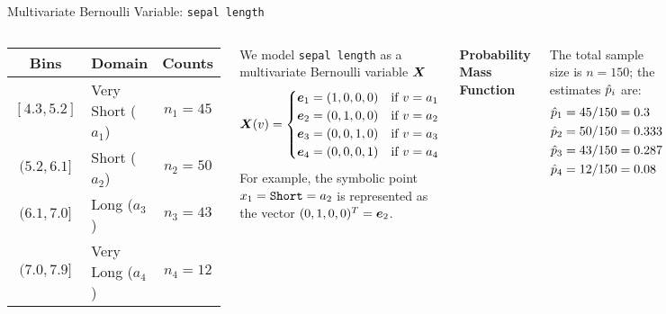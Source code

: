 \begin{frame}{Multivariate Bernoulli Variable: {\tt sepal length}}
  \small
  \begin{columns}
  
\begin{center}
\begin{tabular}{|c|l|c|}
        \hline
        {\bf Bins} & \multicolumn{1}{c}{\bf Domain} & {\bf Counts}\\
        \hline
        $[4.3, 5.2]$ & Very Short ($a_1$) & $n_1 = 45$\\
        $(5.2, 6.1]$ & Short ($a_2$) & $n_2 = 50$\\
        $(6.1, 7.0]$ & Long ($a_3$)& $n_3 = 43$\\
        $(7.0, 7.9]$ & Very Long ($a_4$)& $n_4 = 12$\\
        \hline
    \end{tabular}%
\end{center}
 We model {\tt sepal length} as a multivariate
    Bernoulli variable ${\boldsymbol X}$
    \begin{align*}
        {\boldsymbol X}(v) =
        \begin{cases}
            {\boldsymbol e}_1 = (1,0,0,0) & \text{if } v=a_1\\
            {\boldsymbol e}_2 = (0,1,0,0) & \text{if } v=a_2\\
            {\boldsymbol e}_3 = (0,0,1,0) & \text{if } v=a_3\\
            {\boldsymbol e}_4 = (0,0,0,1) & \text{if } v=a_4\\
        \end{cases}
    \end{align*}
    For example, the
    symbolic point $x_1 = {\tt Short}= a_2$ is
    represented as the vector $(0,1,0,0)^T = {\boldsymbol e}_2$.

	\centerline{\bf Probability Mass Function}

	The total sample size is
    $n=150$; the estimates $\hat{p}_i$ are:
    \begin{align*}
    \hat{p}_1 & = 45/150 = 0.3\\
    \hat{p}_2 & = 50/150 = 0.333\\
    \hat{p}_3 & = 43/150 = 0.287\\
   \hat{p}_4 & = 12/150 = 0.08
    \end{align*}


\end{columns}
\end{frame}
